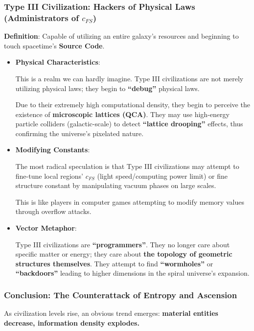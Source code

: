 \subsubsection{Type III Civilization: Hackers of Physical Laws (Administrators of $c_{FS}$)}

\textbf{Definition}: Capable of utilizing an entire galaxy's resources and beginning to touch spacetime's \textbf{Source Code}.

\begin{itemize}
\item \textbf{Physical Characteristics}:

    This is a realm we can hardly imagine. Type III civilizations are not merely utilizing physical laws; they begin to \textbf{``debug''} physical laws.

    Due to their extremely high computational density, they begin to perceive the existence of \textbf{microscopic lattices (QCA)}. They may use high-energy particle colliders (galactic-scale) to detect \textbf{``lattice drooping''} effects, thus confirming the universe's pixelated nature.

\item \textbf{Modifying Constants}:

    The most radical speculation is that Type III civilizations may attempt to fine-tune local regions' $c_{FS}$ (light speed/computing power limit) or fine structure constant by manipulating vacuum phases on large scales.

    This is like players in computer games attempting to modify memory values through overflow attacks.

\item \textbf{Vector Metaphor}:

    Type III civilizations are \textbf{``programmers''}. They no longer care about specific matter or energy; they care about \textbf{the topology of geometric structures themselves}. They attempt to find \textbf{``wormholes''} or \textbf{``backdoors''} leading to higher dimensions in the spiral universe's expansion.
\end{itemize}

\subsubsection{Conclusion: The Counterattack of Entropy and Ascension}

As civilization levels rise, an obvious trend emerges: \textbf{material entities decrease, information density explodes.}


